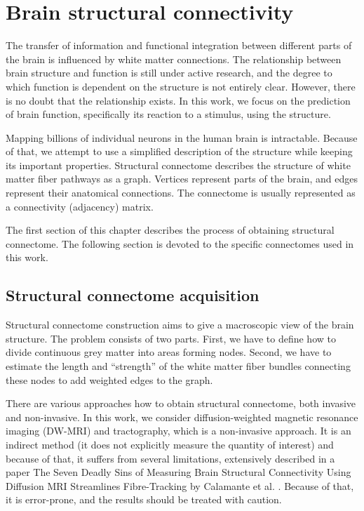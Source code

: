\chapter{Brain structural connectivity}

The transfer of information and functional integration between different parts of the brain is influenced by white matter connections. The relationship between brain structure and function is still under active research, and the degree to which function is dependent on the structure is not entirely clear. However, there is no doubt that the relationship exists. \cite{sotiropoulos_building_2019} In this work, we focus on the prediction of brain function, specifically its reaction to a stimulus, using the structure. 

Mapping billions of individual neurons in the human brain is intractable. Because of that, we attempt to use a simplified description of the structure while keeping its important properties. Structural connectome describes the structure of white matter fiber pathways as a graph. Vertices represent parts of the brain, and edges represent their anatomical connections. The connectome is usually represented as a connectivity (adjacency) matrix. \cite{yeh_mapping_2021}

The first section of this chapter describes the process of obtaining structural connectome. The following section is devoted to the specific connectomes used in this work.

\section{Structural connectome acquisition}


Structural connectome construction aims to give a macroscopic view of the brain structure. The problem consists of two parts. First, we have to define how to divide continuous grey matter into areas forming nodes. Second, we have to estimate the length and \enquote{strength} of the white matter fiber bundles connecting these nodes to add weighted edges to the graph.

There are various approaches how to obtain structural connectome, both invasive and non-invasive. In this work, we consider diffusion-weighted magnetic resonance imaging (DW-MRI) and tractography, which is a non-invasive approach. It is an indirect method (it does not explicitly measure the quantity of interest) and because of that, it suffers from several limitations, extensively described in a paper The Seven Deadly Sins of Measuring Brain Structural Connectivity Using Diffusion MRI Streamlines Fibre-Tracking by Calamante et al. \cite{calamante_seven_2019}. Because of that, it is error-prone, and the results should be treated with caution. \cite{sotiropoulos_building_2019}


